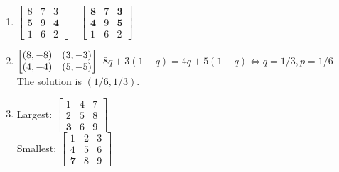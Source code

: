 \documentclass[../main.tex]{subfiles}
\begin{document}
\begin{solution}

\begin{enumerate}
	\item 
	$	\begin{bmatrix}
	  		8 & 7 & 3 \\
	  		5 & 9 & \textbf{4} \\
	  		1 & 6 & 2
	 	\end{bmatrix}
		\quad
		\begin{bmatrix}
			\textbf{8} & 7 & \textbf{3} \\
			\textbf{4} & 9 & \textbf{5} \\
			1 & 6 & 2
		 \end{bmatrix}
	$	 
	\item
	$
		\begin{bmatrix}
		(8,-8) & (3,-3) \\
		(4,-4) & (5,-5)
		\end{bmatrix} \\
	$	
	$ 8q + 3(1-q) = 4q + 5(1-q)
		 \Leftrightarrow q = 1/3, p = 1/6$\\
	The solution is $(1/6,1/3)$.
	
	\item
	Largest: 
	$	\begin{bmatrix}
		 	1 & 4 & 7 \\
		 	2 & 5 & 8 \\
		 	\textbf{3} & 6 & 9
		 \end{bmatrix}$\\
	Smallest:
	$	\begin{bmatrix}
		 	1 & 2 & 3 \\
		 	4 & 5 & 6 \\
		 	\textbf{7} & 8 & 9
		\end{bmatrix}$\\
\end{enumerate}
\end{solution}
\end{document}

